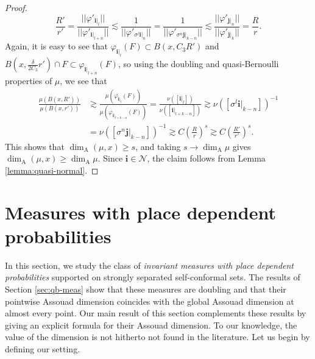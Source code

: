 \documentclass{PRM}
\theoremstyle{plain}
\theoremstyle{definition}
\theoremstyle{remark}
\begin{document}
\begin{proof}
\begin{equation*}
    \frac{R'}{r'}=\frac{||\varphi'_{\mathbf{i}|_{l}}||}{||\varphi'_{\mathbf{i}|_{l+n}}||}\lesssim \frac{1}{||\varphi'_{\sigma^l\mathbf{i}|_{n}}||}=\frac{1}{||\varphi'_{\sigma^{n}\mathbf{j}|_{k-n}}||}\lesssim\frac{ ||\varphi'_{\mathbf{j}|_{n}}||}{||\varphi'_{\mathbf{j}|_{k}}||}=\frac{R}{r}.
\end{equation*}
Again, it is easy to see that $\varphi_{\mathbf{i}|_{l}}(F)\subset B(x,C_3R')$ and $B(x,\frac{\delta}{2C_3}r')\cap F\subset \varphi_{\mathbf{i}|_{l+n}}(F)$, so using the doubling and quasi-Bernoulli properties of $\mu$, we see that
\begin{align*}
    \frac{\mu(B(x,R'))}{\mu(B(x,r'))}&\gtrsim\frac{\mu(\varphi_{\mathbf{i}|_{l}}(F))}{\mu(\varphi_{\mathbf{i}|_{l+k-n}}(F))}=\frac{\nu([\mathbf{i}|_{l}])}{\nu([\mathbf{i}|_{l+k-n}])}\gtrsim \nu([\sigma^l\mathbf{i}|_{k-n}])^{-1}\\
    &=\nu([\sigma^{n}\mathbf{j}|_{k-n}])^{-1} \gtrsim C\left(\frac{R}{r}\right)^s\gtrsim C\left(\frac{R'}{r'}\right)^s.
\end{align*}
This shows that $\dim_{\mathrm{A}}(\mu,x)\geq s$, and taking $s\to\dim_{\mathrm{A}}\mu$ gives $\dim_{\mathrm{A}}(\mu,x)\geq \dim_{\mathrm{A}}\mu$. Since $\mathbf{i}\in\mathcal{N}$, the claim follows from Lemma \ref{lemma:quasi-normal}.
\end{proof}


\section{Measures with place dependent probabilities}\label{sec:invmeas}
In this section, we study the class of \emph{invariant measures with place dependent probabilities} supported on strongly separated self-conformal sets. The results of Section \ref{sec:qb-meas} show that these measures are doubling and that their pointwise Assouad dimension coincides with the global Assouad dimension at almost every point. Our main result of this section complements these results by giving an explicit formula for their Assouad dimension. To our knowledge, the value of the dimension is not hitherto not found in the literature. Let us begin by defining our setting.
\end{document}
